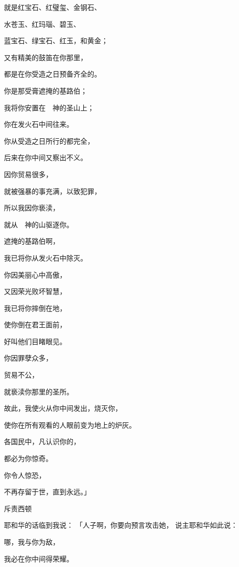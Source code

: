 {\par }{\Q 就是红宝石、红璧玺、金钢石、
\par }{\Q 水苍玉、红玛瑙、碧玉、
\par }{\Q 蓝宝石、绿宝石、红玉，和黄金；
\par }{\Q 又有精美的鼓笛在你那里，
\par }{\Q 都是在你受造之日预备齐全的。
\par }{\Q {}你是那受膏遮掩{}的基路伯；
\par }{\Q 我将你安置在　神的圣山上；
\par }{\Q 你在发{}火{}石中间往来。
\par }{\Q {}你从受造之日所行的都完全，
\par }{\Q 后来在你中间又察出不义。
\par }{\Q {}因你贸易很多，
\par }{\Q 就被强暴的事充满，以致犯罪，
\par }{\Q 所以我因你亵渎{}，
\par }{\Q 就从　神的山驱逐你。
\par }{\Q 遮掩{}的基路伯啊，
\par }{\Q 我已将你从发{}火{}石中除灭。
\par }{\Q {}你因美丽心中高傲，
\par }{\Q 又因荣光败坏智慧，
\par }{\Q 我已将你摔倒在地，
\par }{\Q 使你倒在君王面前，
\par }{\Q 好叫他们目睹眼见。
\par }{\Q {}你因罪孽众多，
\par }{\Q 贸易不公，
\par }{\Q 就亵渎你那里的圣所。
\par }{\Q 故此，我使火从你中间发出，烧灭你，
\par }{\Q 使你在所有观看的人眼前变为地上的炉灰。
\par }{\Q {}各国民中，凡认识你的，
\par }{\Q 都必为你惊奇。
\par }{\Q 你令人惊恐，
\par }{\Q 不再存留于世，直到永远。」
\par }{\SH 斥责西顿
\par }{\Q {}耶和华的话临到我说：
「人子啊，你要向{}预言攻击她，
说主耶和华如此说：
\par }{哪，我与你为敌，
\par }{\Q 我必在你中间得荣耀。
}
